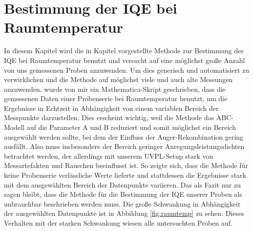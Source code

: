 \chapter{Bestimmung der IQE bei Raumtemperatur}
\thispagestyle{fancy}

In diesem Kapitel wird die in Kapitel vorgestellte Methode zur Bestimmung der IQE bei Raumtemperatur benutzt und versucht auf eine möglichst große Anzahl von uns gemessenen Proben anzuwenden. 
Um dies generisch und automatisiert zu verwirklichen und die Methode auf möglichst viele und auch alte Messungen anzuwenden, wurde von mir ein Mathematica-Skript geschrieben, dass die gemessenen Daten einer Probenserie bei Raumtemperatur benutzt, um die Ergebnisse in Echtzeit in Abhängigkeit von einem variablen Bereich der Messpunkte darzustellen. Dies erscheint wichtig, weil die Methode das ABC-Modell auf die Parameter A und B reduziert und somit möglichst ein Bereich ausgewählt werden sollte, bei dem der Einfluss der Auger-Rekombination gering ausfällt. Also muss insbesondere der Bereich geringer Anregungsleistungsdichten betrachtet werden, der allerdings mit unserem UVPL-Setup stark von Messartefakten und Rauschen beeinflusst ist. So zeigte sich, dass die Methode für keine Probenserie verlässliche Werte lieferte und stattdessen die Ergebnisse stark mit dem ausgewählten Bereich der Datenpunkte variieren.
Das als Fazit nur zu sagen bleibt, dass die Methode für die Bestimmung der IQE unserer Proben als unbrauchbar beschrieben werden muss. Die große Schwankung in Abhängigkeit der ausgewählten Datenpunkte ist in Abbildung \ref{fig:raumtemp} zu sehen. Dieses Verhalten mit der starken Schwankung wiesen alle untersuchten Proben auf. 
%
